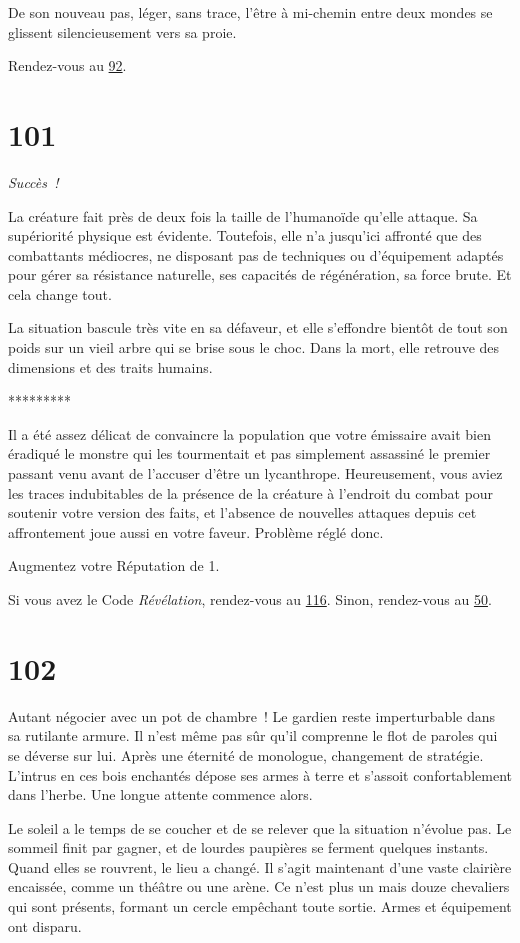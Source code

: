 \documentclass{report}
\newcommand{\gsection}[1]{
    \section{#1}
    \label{section-#1}
}
\newcommand{\glink}[1]{\hyperref[section-#1]{#1}}
\newcommand{\ellipse}{
    \begin{center}
        *********
    \end{center}
}
\newcommand{\success}{\emph{Succès !}}
\begin{document}
De son nouveau pas, léger, sans trace, l'être à mi-chemin entre deux mondes se glissent silencieusement vers sa proie.

Rendez-vous au \glink{92}.

\gsection{101}

\success

La créature fait près de deux fois la taille de l'humanoïde qu'elle attaque. Sa supériorité physique est évidente. Toutefois, elle n'a jusqu'ici affronté que des combattants médiocres, ne disposant pas de techniques ou d'équipement adaptés pour gérer sa résistance naturelle, ses capacités de régénération, sa force brute. Et cela change tout.

La situation bascule très vite en sa défaveur, et elle s'effondre bientôt de tout son poids sur un vieil arbre qui se brise sous le choc. Dans la mort, elle retrouve des dimensions et des traits humains.

\ellipse

Il a été assez délicat de convaincre la population que votre émissaire avait bien éradiqué le monstre qui les tourmentait et pas simplement assassiné le premier passant venu avant de l'accuser d'être un lycanthrope. Heureusement, vous aviez les traces indubitables de la présence de la créature à l'endroit du combat pour soutenir votre version des faits, et l'absence de nouvelles attaques depuis cet affrontement joue aussi en votre faveur. Problème réglé donc.

Augmentez votre Réputation de 1.

Si vous avez le Code \emph{Révélation}, rendez-vous au \glink{116}. Sinon, rendez-vous au \glink{50}.

\gsection{102}

Autant négocier avec un pot de chambre ! Le gardien reste imperturbable dans sa rutilante armure. Il n'est même pas sûr qu'il comprenne le flot de paroles qui se déverse sur lui. Après une éternité de monologue, changement de stratégie. L'intrus en ces bois enchantés dépose ses armes à terre et s'assoit confortablement dans l'herbe. Une longue attente commence alors.

Le soleil a le temps de se coucher et de se relever que la situation n'évolue pas. Le sommeil finit par gagner, et de lourdes paupières se ferment quelques instants. Quand elles se rouvrent, le lieu a changé. Il s'agit maintenant d'une vaste clairière encaissée, comme un théâtre ou une arène. Ce n'est plus un mais douze chevaliers qui sont présents, formant un cercle empêchant toute sortie. Armes et équipement ont disparu.
\end{document}
